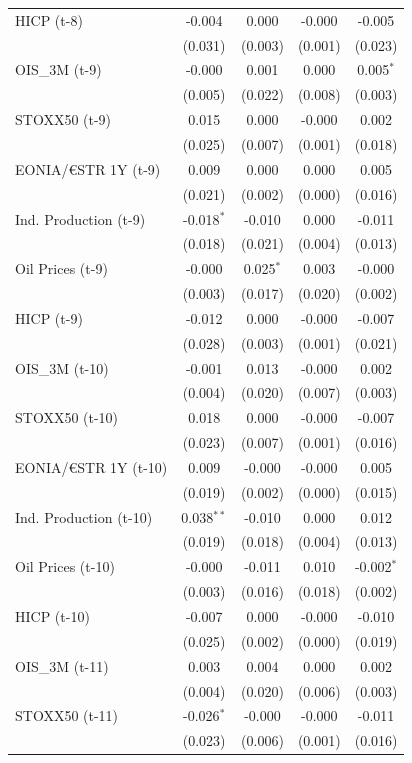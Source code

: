 \begin{longtable}[t]{lcccc}
HICP (t-8) & -0.004 & 0.000 & -0.000 & -0.005\\
 & (0.031) & (0.003) & (0.001) & (0.023)\\
OIS\_3M (t-9) & -0.000 & 0.001 & 0.000 & 0.005$^{*}$\\
 & (0.005) & (0.022) & (0.008) & (0.003)\\
STOXX50 (t-9) & 0.015 & 0.000 & -0.000 & 0.002\\
 & (0.025) & (0.007) & (0.001) & (0.018)\\
EONIA/€STR 1Y (t-9) & 0.009 & 0.000 & 0.000 & 0.005\\
 & (0.021) & (0.002) & (0.000) & (0.016)\\
Ind. Production (t-9) & -0.018$^{*}$ & -0.010 & 0.000 & -0.011\\
 & (0.018) & (0.021) & (0.004) & (0.013)\\
Oil Prices (t-9) & -0.000 & 0.025$^{*}$ & 0.003 & -0.000\\
 & (0.003) & (0.017) & (0.020) & (0.002)\\
HICP (t-9) & -0.012 & 0.000 & -0.000 & -0.007\\
 & (0.028) & (0.003) & (0.001) & (0.021)\\
OIS\_3M (t-10) & -0.001 & 0.013 & -0.000 & 0.002\\
 & (0.004) & (0.020) & (0.007) & (0.003)\\
STOXX50 (t-10) & 0.018 & 0.000 & -0.000 & -0.007\\
 & (0.023) & (0.007) & (0.001) & (0.016)\\
EONIA/€STR 1Y (t-10) & 0.009 & -0.000 & -0.000 & 0.005\\
 & (0.019) & (0.002) & (0.000) & (0.015)\\
Ind. Production (t-10) & 0.038$^{**}$ & -0.010 & 0.000 & 0.012\\
 & (0.019) & (0.018) & (0.004) & (0.013)\\
Oil Prices (t-10) & -0.000 & -0.011 & 0.010 & -0.002$^{*}$\\
 & (0.003) & (0.016) & (0.018) & (0.002)\\
HICP (t-10) & -0.007 & 0.000 & -0.000 & -0.010\\
 & (0.025) & (0.002) & (0.000) & (0.019)\\
OIS\_3M (t-11) & 0.003 & 0.004 & 0.000 & 0.002\\
 & (0.004) & (0.020) & (0.006) & (0.003)\\
STOXX50 (t-11) & -0.026$^{*}$ & -0.000 & -0.000 & -0.011\\
 & (0.023) & (0.006) & (0.001) & (0.016)\\

\end{longtable}
